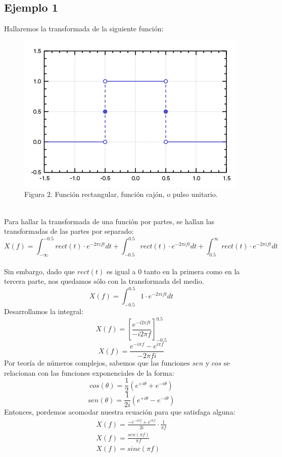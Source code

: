 \documentclass[preprint,review,12pt]{elsarticle}
\begin{document}
\subsection{Ejemplo 1}
Hallaremos la transformada de la siguiente función:\\
\begin{figure}[h]
    \centering
    \includegraphics[scale=0.5]{Figuras/Funcion_cajon.png}
    \\
    \small Figura 2. Función rectangular, función cajón, o pulso unitario.\\
\end{figure}\\
Para hallar la transformada de una función por partes, se hallan las transformadas
de las partes por separado:\\
\[
    X(f) = \int_{- \infty}^{-0.5} rect(t) \cdot e^{-2\pi ift} dt +
    \int_{-0.5}^{0.5} rect(t) \cdot e^{-2\pi ift} dt + 
    \int_{0.5}^{\infty} rect(t) \cdot e^{-2\pi ift} dt
\]
\\
Sin embargo, dado que $rect(t)$ es igual a 0 tanto en la primera como en la
tercera parte, nos quedamos sólo con la transformada del medio.\\
\[
    X(f) = \int_{-0.5}^{0.5} 1\cdot e^{-2\pi ift} dt
\]
Desarrollamos la integral:\\
\[
    X(f) = [\frac{e^{-i2\pi ft}}{-i2\pi f}]_{-0.5}^{0.5}
\]
\[
    X(f) = \frac{e^{-i\pi f} - e^{i\pi f} }{-2\pi fi}  
\]
Por teoría de números complejos, sabemos que las funciones $sen$ y $cos$ se
relacionan con las funciones exponenciales de la forma:\\
\begin{equation}
    cos(\theta) = \frac{1}{2}(e^{+i\theta}+e^{-i\theta})
\end{equation}
\begin{equation}
    sen(\theta) = \frac{1}{2i}(e^{+i\theta}-e^{-i\theta})
\end{equation}
Entonces, pordemos acomodar nuestra ecuación para que satisfaga alguna:\\
\begin{align*}
    X(f) = \frac{-e^{-i\pi f} + e^{i\pi f}}{2i} \cdot \frac{1}{\pi f}\\
    X(f) = \frac{sen(\pi f)}{\pi f}  \\
    X(f) = sinc(\pi f)\\
\end{align*}
  
\end{document}
